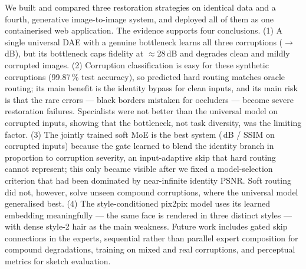 We built and compared three restoration strategies on identical data and a fourth, generative image-to-image system, and deployed all of them as one containerised web application. The evidence supports four conclusions. (1) A single universal DAE with a genuine bottleneck learns all three corruptions (\INPUTPSNRCORR$\to$\TONEPSNRCORR\,dB), but its bottleneck caps fidelity at $\approx$28\,dB and degrades clean and mildly corrupted images. (2) Corruption classification is easy for these synthetic corruptions (99.87\,\% test accuracy), so predicted hard routing matches oracle routing; its main benefit is the identity bypass for clean inputs, and its main risk is that the rare errors --- black borders mistaken for occluders --- become severe restoration failures. Specialists were not better than the universal model on corrupted inputs, showing that the bottleneck, not task diversity, was the limiting factor. (3) The jointly trained soft MoE is the best system (\MOEPSNRCORR\,dB / \MOESSIMCORR{} SSIM on corrupted inputs) because the gate learned to blend the identity branch in proportion to corruption severity, an input-adaptive skip that hard routing cannot represent; this only became visible after we fixed a model-selection criterion that had been dominated by near-infinite identity PSNR. Soft routing did not, however, solve unseen compound corruptions, where the universal model generalised best. (4) The style-conditioned pix2pix model uses its learned embedding meaningfully --- the same face is rendered in three distinct styles --- with dense style-2 hair as the main weakness. Future work includes gated skip connections in the experts, sequential rather than parallel expert composition for compound degradations, training on mixed and real corruptions, and perceptual metrics for sketch evaluation.
